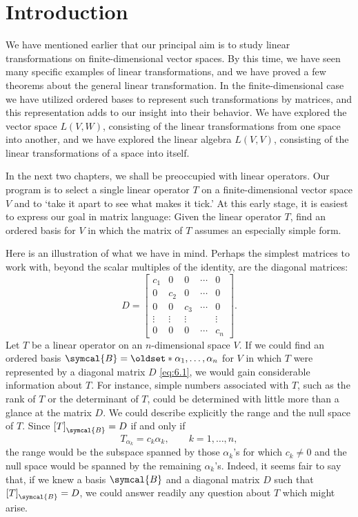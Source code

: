 \section{Introduction}

We have mentioned earlier that our principal aim is to study linear transformations on finite-dimensional vector spaces. By this time, we have seen many specific examples of linear transformations, and we have proved a few theorems about the general linear transformation. In the finite-dimensional case we have utilized ordered bases to represent such transformations by matrices, and this representation adds to our insight into their behavior. We have explored the vector space \(L\left(V,W\right)\), consisting of the linear transformations from one space into another, and we have explored the linear algebra \(L\left(V,V\right)\), consisting of the linear transformations of a space into itself.

In the next two chapters, we shall be preoccupied with linear operators. Our program is to select a single linear operator \(T\) on a finite-dimensional vector space \(V\) and to `take it apart to see what makes it tick.' At this early stage, it is easiest to express our goal in matrix language: Given the linear operator \(T\), find an ordered basis for \(V\) in which the matrix of \(T\) assumes an especially simple form.

Here is an illustration of what we have in mind. Perhaps the simplest matrices to work with, beyond the scalar multiples of the identity, are the diagonal matrices:
\begin{equation}
    D=
    \begin{bmatrix}
        c_1 & 0 & 0 & \cdots & 0 \\
        0 & c_2 & 0 & \cdots & 0 \\
        0 & 0 & c_3 & \cdots & 0 \\
        \vdots & \vdots & \vdots && \vdots \\
        0 & 0 & 0 & \cdots & c_n
    \end{bmatrix}
    .\label{eq:6.1}
\end{equation}
Let \(T\) be a linear operator on an \(n\)-dimensional space \(V\). If we could find an ordered basis \(\symcal{B}=\set{\alpha_1,\ldots,\alpha_n}\) for \(V\) in which \(T\) were represented by a diagonal matrix \(D\) \eqref{eq:6.1}, we would gain considerable information about \(T\). For instance, simple numbers associated with \(T\), such as the rank of \(T\) or the determinant of \(T\), could be determined with little more than a glance at the matrix \(D\). We could describe explicitly the range and the null space of \(T\). Since \(\left[T\right]_{\symcal{B}}=D\) if and only if
\begin{equation}
    T_{\alpha_k}=c_k\alpha_k,\qquad k=1,\ldots,n,\label{eq:6.2}
\end{equation}
the range would be the subspace spanned by those \(\alpha_k\)'s for which \(c_k\ne0\) and the null space would be spanned by the remaining \(\alpha_k\)'s. Indeed, it seems fair to say that, if we knew a basis \(\symcal{B}\) and a diagonal matrix \(D\) such that \(\left[T\right]_{\symcal{B}}=D\), we could answer readily any question about \(T\) which might arise.

